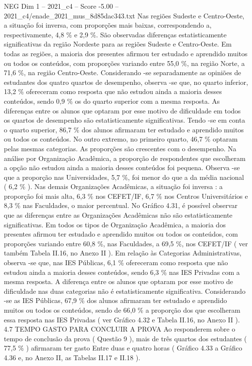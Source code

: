 \begin{textsample}{NEG Dim 1 – 2021\_c4 – Score -5.00 – 2021\_c4/enade\_2021\_mus\_8d85dac343.txt}
Nas regiões Sudeste e Centro-Oeste, a situação foi inversa, com proporções mais baixas, correspondendo a, respectivamente, 4,8 \% e 2,9 \%.
São observadas diferenças estatisticamente significativas da região Nordeste para as regiões Sudeste e Centro-Oeste.
Em todas as regiões, a maioria dos presentes afirmou ter estudado e aprendido muitos ou todos os conteúdos, com proporções variando entre 55,0 \%, na região Norte, a 71,6 \%, na região Centro-Oeste.
Considerando -se separadamente as opiniões de estudantes dos quatro quartos de desempenho, observa -se que, no quarto inferior, 13,2 \% ofereceram como resposta que não estudou ainda a maioria desses conteúdos, sendo 0,9 \% os do quarto superior com a mesma resposta.
As diferenças entre os alunos que optaram por esse motivo de dificuldade em todos os quartos de desempenho são estatisticamente significativas.
Tendo -se em conta o quarto superior, 86,7 \% dos alunos afirmaram ter estudado e aprendido muitos ou todos os conteúdos.
No outro extremo, no primeiro quarto, 46,7 \% optaram pelas mesmas categorias.
As proporções são crescentes com o desempenho.
Na análise por Organização Acadêmica, a proporção de respondentes que escolheram a opção não estudou ainda a maioria desses conteúdos foi pequena.
Observa -se que a proporção nas Universidades, 5,7 \%, foi menor do que a da média nacional ( 6,2 \% ).
Nas demais Organizações Acadêmicas, a situação foi inversa : a proporção foi mais alta, 6,3 \% nos CEFET/IF, 6,7 \% nos Centros Universitários e 8,3 \% nas Faculdades, o maior percentual.
No Gráfico 4.31, é possível observar que as diferenças entre as Organizações Acadêmicas não são estatisticamente significativas.
Em todos os tipos de Organização Acadêmica, a maioria dos presentes afirmou ter estudado e aprendido muitos ou todos os conteúdos, com proporções variando entre 60,8 \%, nas Faculdades, a 69,5 \%, nos CEFET/IF ( ver também Tabela II.16, no Anexo II ).
Em relação às Categorias Administrativas, observa -se que, nas IES Públicas, 6,1 \% ofereceram como resposta que não estudou ainda a maioria desses conteúdos, sendo 6,3 \% nas IES Privadas com a mesma resposta.
A diferença entre os alunos que optaram por esse motivo de dificuldade nas duas categorias não é estatisticamente significativa.
Considerando -se as IES Públicas, 67,9 \% dos alunos afirmaram ter estudado e aprendido muitos ou todos os conteúdos, sendo de 66,0 \% a proporção dos que escolheram essa resposta nas IES Privadas ( ver Gráfico 4.32 e Tabela II.16, no Anexo II ). 4.7 TEMPO GASTO PARA CONCLUIR A PROVA Ao responderem sobre o tempo de conclusão da prova ( Questão 9 ), mais de três quartos dos estudantes ( 77,5 \% ) afirmaram ter gasto Entre duas e quatro horas ( Gráfico 4.33 a Gráfico 4.36 e, no Anexo II, as Tabelas II.17 e II.18 ).

\end{textsample}
